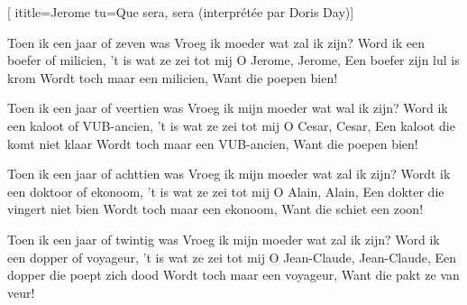  [
ititle={Jerome}
tu={Que sera, sera (interprétée par Doris Day)}]

\beginverse
Toen ik een jaar of zeven was
Vroeg ik moeder wat zal ik zijn?
Word ik een boefer of milicien, 't is wat ze zei tot mij
O Jerome, Jerome,
Een boefer zijn lul is krom
Wordt toch maar een milicien,
Want die poepen bien!
\endverse

\beginverse
Toen ik een jaar of veertien was
Vroeg ik mijn moeder wat wal ik zijn?
Word ik een kaloot of VUB-ancien, 't is wat ze zei tot mij
O Cesar, Cesar,
Een kaloot die komt niet klaar
Wordt toch maar een VUB-ancien, 
Want die poepen bien!
\endverse

\beginverse
Toen ik een jaar of achttien was
Vroeg ik mijn moeder wat zal ik zijn?
Wordt ik een doktoor of ekonoom, 't is wat ze zei tot mij
O Alain, Alain,
Een dokter die vingert niet bien
Wordt toch maar een ekonoom,
Want die schiet een zoon!
\endverse

\beginverse
Toen ik een jaar of twintig was
Vroeg ik mijn moeder wat zal ik zijn?
Word ik een dopper of voyageur, 't is wat ze zei tot mij
O Jean-Claude, Jean-Claude,
Een dopper die poept zich dood
Wordt toch maar een voyageur,
Want die pakt ze van veur!
\endverse
\endsong